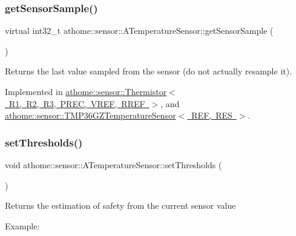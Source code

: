 \subsubsection{\texorpdfstring{get\+Sensor\+Sample()}{getSensorSample()}}
{\footnotesize\ttfamily virtual int32\+\_\+t athome\+::sensor\+::\+A\+Temperature\+Sensor\+::get\+Sensor\+Sample (\begin{DoxyParamCaption}{ }\end{DoxyParamCaption})\hspace{0.3cm}{\ttfamily [pure virtual]}}

Returns the last value sampled from the sensor (do not actually resample it). 

Implemented in \mbox{\hyperlink{classathome_1_1sensor_1_1_thermistor_abc45d8d277fb186b5d303f9e53bf73d4}{athome\+::sensor\+::\+Thermistor$<$ R1, R2, R3, P\+R\+E\+C, V\+R\+E\+F, R\+R\+E\+F $>$}}, and \mbox{\hyperlink{classathome_1_1sensor_1_1_t_m_p36_g_z_temperature_sensor_ae0e101ee54c5c64842d2cab9fb9292f4}{athome\+::sensor\+::\+T\+M\+P36\+G\+Z\+Temperature\+Sensor$<$ R\+E\+F, R\+E\+S $>$}}.

\mbox{\label{classathome_1_1sensor_1_1_a_temperature_sensor_a1c323184ac116784e877151895dfd080}} 
\subsubsection{\texorpdfstring{set\+Thresholds()}{setThresholds()}}
{\footnotesize\ttfamily void athome\+::sensor\+::\+A\+Temperature\+Sensor\+::set\+Thresholds (\begin{DoxyParamCaption}\item[{const \mbox{\hyperlink{structathome_1_1sensor_1_1_i_sensor_1_1_i_sensor_thresholds}{I\+Sensor\+Thresholds}} \&}]{ }\end{DoxyParamCaption})\hspace{0.3cm}{\ttfamily [virtual]}}

Returns the estimation of safety from the current sensor value

Example\+:


